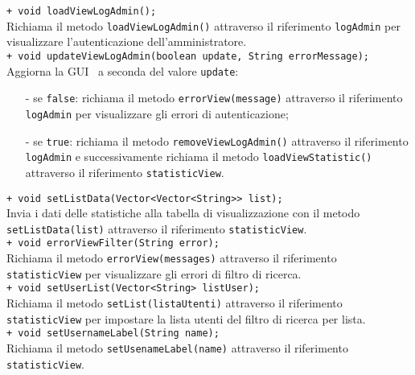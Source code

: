 {\begin{sloppypar}
{{{\begin{itemize}
					\texttt{+ void loadViewLogAdmin();}\\
					Richiama il metodo \texttt{loadViewLogAdmin()} attraverso il riferimento \texttt{logAdmin} per visualizzare l'autenticazione dell'amministratore.\\
					
					\texttt{+ void updateViewLogAdmin(boolean update, String errorMessage);}\\
					Aggiorna la GUI\g~ a seconda del valore \texttt{update}:
					\begin{itemize}
						\item[-] se \texttt{false}: richiama il metodo \texttt{errorView(message)} attraverso il riferimento \texttt{logAdmin} per visualizzare gli errori di autenticazione;
						\item[-] se \texttt{true}: richiama il metodo \texttt{removeViewLogAdmin()} attraverso il riferimento \texttt{logAdmin} e successivamente richiama il metodo \texttt{loadViewStatistic()} attraverso il riferimento \texttt{statisticView}.\\
					\end{itemize}
					
					\texttt{+ void setListData(Vector<Vector<String>> list);}\\
					Invia i dati delle statistiche alla tabella di visualizzazione con il metodo \texttt{setListData(list)} attraverso il riferimento \texttt{statisticView}.\\
					
					\texttt{+ void errorViewFilter(String error);}\\
					Richiama il metodo \texttt{errorView(messages)} attraverso il riferimento \texttt{statisticView} per visualizzare gli errori di filtro di ricerca.\\
					
					\texttt{+ void setUserList(Vector<String> listUser);}\\
					Richiama il metodo \texttt{setList(listaUtenti)} attraverso il riferimento \texttt{statisticView} per impostare la lista utenti del filtro di ricerca per lista.\\
					
					\texttt{+ void setUsernameLabel(String name);}\\
					Richiama il metodo \texttt{setUsenameLabel(name)} attraverso il riferimento \texttt{statisticView}.\\
			\end{itemize}
			}
		
}}
\end{sloppypar}}
